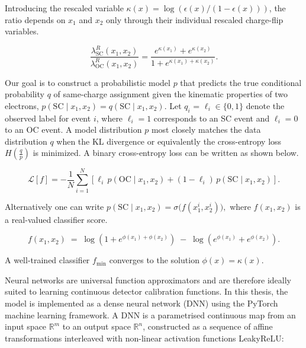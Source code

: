 Introducing the rescaled variable \(\kappa(x) = \log\!\left(\epsilon(x)/(1-\epsilon(x))\right)\), the ratio depends on \(x_1\) and \(x_2\) only through their individual rescaled charge-flip variables.

\begin{equation}
\label{eq:ratio_kappa}
\frac{\lambda_{\mathrm{SC}}^{R}(x_1,x_2)}{\lambda_{\mathrm{OC}}^{R}(x_1,x_2)}
=
\frac{e^{\kappa(x_1)}+e^{\kappa(x_2)}}{1+e^{\kappa(x_1)+\kappa(x_2)}}.
\end{equation}

Our goal is to construct a probabilistic model \(p\) that predicts the true conditional probability  \(q\)  of same-charge assignment given the kinematic properties of two electrons, 
\(
p\!\left(\mathrm{SC}\mid x_1,x_2\right)
=
q\!\left(\mathrm{SC}\mid x_1,x_2\right).
\)
Let \(q_i\) = \(\ell_i \in \{0,1\}\) denote the observed label for event \(i\), where \(\ell_i=1\) corresponds to an SC event and \(\ell_i=0\) to an OC event. A model distribution \(p\) most closely matches the data distribution \(q\) when the KL divergence or equivalently the cross-entropy loss $H(\frac{q}{p})$ is minimized. A binary cross-entropy loss can be written as shown below.

\begin{equation}
\label{eq:loss}
\mathcal{L}[f]
=
-\frac{1}{N}
\sum_{i=1}^{N}
\left[
\ell_i\,
p(\mathrm{OC} \mid x_1, x_2)
+
(1-\ell_i)\,
p(\mathrm{SC} \mid x_1, x_2)
\right].
\end{equation}


Alternatively one can write \(
p(\mathrm{SC} \mid x_1, x_2)
=
\sigma\!\big(f(x_1^i,x_2^i)\big),
\) where \(f(x_1,x_2)\) is a real-valued classifier score.


\begin{equation}
    \label{eq:f_phi}
    f(x_1,x_2)
    \;=\; \log\!\left(1 + e^{\phi(x_1) + \phi(x_2)}\right)
    \;-\; \log\!\left(e^{\phi(x_1)} + e^{\phi(x_2)}\right).
\end{equation}

A well-trained classifier \(f_{\mathrm{min}}\) converges to the
solution \(\phi(x) = \kappa(x)\).

Neural networks are universal function approximators and are therefore ideally suited to learning continuous detector calibration functions. In this thesis, the model is implemented as a dense neural network (DNN) using the PyTorch machine learning framework. A DNN is a parametrised continuous map from an input space \(\mathbb{R}^m\) to an output space \(\mathbb{R}^n\), constructed as a sequence of affine transformations interleaved with non-linear activation functions LeakyReLU:

